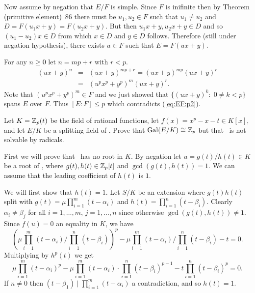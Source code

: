 \begin{myenumerate}
Now assume by negation that \(E/F\) is simple.
Since $F$ is inifinite then by
Theorem (primitive element)~86 \cite{Rotman98}
there must be \(u_1,u_2\in F\)
such that \(u_1 \neq u_2\) and \(D = F(u_1 x + y) = F(u_2 x + y)\).
But then \(u_1 x + y, u_2 x + y \in D\) and
so \((u_1 - u_2)x \in D\) from which \(x\in D\) and \(y\in D\) follows.
Therefore (still under negation hypothesis),
there exists \(u\in F\) such that \(E = F(ux + y)\).

For any \(n \geq 0\) let \(n=mp+r\) with \(r<p\).
\begin{eqnarray*}
 (ux+y)^n
   & = & (ux+y)^{mp+r} = (ux+y)^{mp}(ux+y)^r \\
   & = & (u^p x^p + y^p)^m (ux+y)^r.
\end{eqnarray*}
Note that \((u^p x^p + y^p)^m \in F\)
and we just showed that
\(\{(ux + y)^k:\; 0 \neq k < p\}\) spans $E$ over $F$.
Thus \([E:F]\leq p\) which contradicts (\ref{eq:EF:p2}).


\item
\begin{excopy} \label{ex:Zp:xpxt}
Let \(K=\mathbb{Z}_p(t)\) be the field of rational functions,
let \(f(x) = x^p - x - t \in K[x]\),
and let \(E/K\) be a splitting field of \fx.
Prove that \(\mathop{\rm Gal}\nolimits(E/K) \cong \mathbb{Z}_p\) but that \fx\ is not solvable by radicals.
\end{excopy}

First we will prove that \fx\ has no root in $K$.
By negation let \(u = g(t)/h(t) \in K\) be a root of \fx,
where \(g(t),h(t)\in \mathbb{Z}_p[t]\) and \(\gcd(g(t),h(t)) = 1\).
We can assume that the leading coefficient of \(h(t)\) is $1$.

We will first show that \(h(t)=1\).
Let \(S/K\) be an extension where \(g(t)h(t)\) split with
\(g(t) = \mu \prod_{i=1}^m (t - \alpha_i)\)
and
\(h(t) = \prod_{i=1}^n (t - \beta_i)\).
Clearly \(\alpha_i \neq \beta_j\) for all \(i=1,\ldots,m\), \(j=1,\ldots,n\)
since otherwise \(\gcd(g(t),h(t)) \neq 1\).
Since \(f(u) = 0\) an equality in $K$, we have
\begin{equation} \label{eq:xpxt:ghp}
 \left(\mu \prod_{i=1}^m (t - \alpha_i) / \prod_{i=1}^n (t - \beta_i)\right)^p
 - \mu \prod_{i=1}^m (t - \alpha_i) / \prod_{i=1}^n (t - \beta_i) - t = 0.
\end{equation}
Multiplying by \(h^p(t)\) we get
\begin{equation*}
 \mu \prod_{i=1}^m (t - \alpha_i)^p
 - \mu \prod_{i=1}^m (t - \alpha_i) \cdot \prod_{i=1}^n (t - \beta_i)^{p-1}
 - t \prod_{i=1}^n (t - \beta_i)^p = 0.
\end{equation*}
If \(n \neq 0\) then \((t - \beta_1) \mid \prod_{i=1}^m (t - \alpha_i)\)
a contradiction, and so \(h(t) = 1\).


\end{myenumerate}
